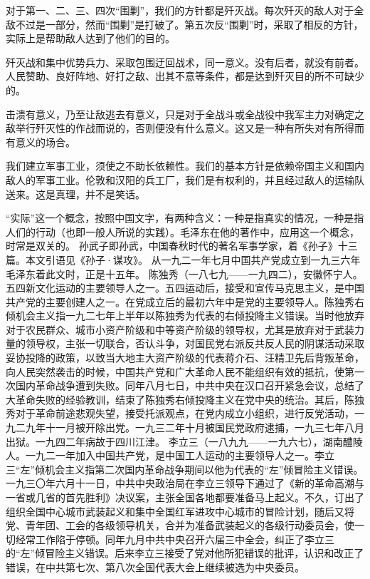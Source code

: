 对于第一、二、三、四次“围剿”，我们的方针都是歼灭战。每次歼灭的敌人对于全敌不过是一部分，然而“围剿”是打破了。第五次反“围剿”时，采取了相反的方针，实际上是帮助敌人达到了他们的目的。

歼灭战和集中优势兵力、采取包围迂回战术，同一意义。没有后者，就没有前者。人民赞助、良好阵地、好打之敌、出其不意等条件，都是达到歼灭目的所不可缺少的。

击溃有意义，乃至让敌逃去有意义，只是对于全战斗或全战役中我军主力对确定之敌举行歼灭性的作战而说的，否则便没有什么意义。这又是一种有所失对有所得而有意义的场合。

我们建立军事工业，须使之不助长依赖性。我们的基本方针是依赖帝国主义和国内敌人的军事工业。伦敦和汉阳的兵工厂，我们是有权利的，并且经过敌人的运输队送来。这是真理，并不是笑话。


\begin{maonote}
“实际”这一个概念，按照中国文字，有两种含义：一种是指真实的情况，一种是指人们的行动（也即一般人所说的实践）。毛泽东在他的著作中，应用这一个概念，时常是双关的。
孙武子即孙武，中国春秋时代的著名军事学家，着《孙子》十三篇。本文引语见《孙子·谋攻》。
从一九二一年七月中国共产党成立到一九三六年毛泽东着此文时，正是十五年。
陈独秀（一八七九——一九四二），安徽怀宁人。五四新文化运动的主要领导人之一。五四运动后，接受和宣传马克思主义，是中国共产党的主要创建人之一。在党成立后的最初六年中是党的主要领导人。陈独秀右倾机会主义指一九二七年上半年以陈独秀为代表的右倾投降主义错误。当时他放弃对于农民群众、城市小资产阶级和中等资产阶级的领导权，尤其是放弃对于武装力量的领导权，主张一切联合，否认斗争，对国民党右派反共反人民的阴谋活动采取妥协投降的政策，以致当大地主大资产阶级的代表蒋介石、汪精卫先后背叛革命，向人民突然袭击的时候，中国共产党和广大革命人民不能组织有效的抵抗，使第一次国内革命战争遭到失败。同年八月七日，中共中央在汉口召开紧急会议，总结了大革命失败的经验教训，结束了陈独秀右倾投降主义在党中央的统治。其后，陈独秀对于革命前途悲观失望，接受托派观点，在党内成立小组织，进行反党活动，一九二九年十一月被开除出党。一九三二年十月被国民党政府逮捕，一九三七年八月出狱。一九四二年病故于四川江津。
李立三（一八九九——一九六七），湖南醴陵人。一九二一年加入中国共产党，是中国工人运动的主要领导人之一。李立三“左”倾机会主义指第二次国内革命战争期间以他为代表的“左”倾冒险主义错误。一九三〇年六月十一日，中共中央政治局在李立三领导下通过了《新的革命高潮与一省或几省的首先胜利》决议案，主张全国各地都要准备马上起义。不久，订出了组织全国中心城市武装起义和集中全国红军进攻中心城市的冒险计划，随后又将党、青年团、工会的各级领导机关，合并为准备武装起义的各级行动委员会，使一切经常工作陷于停顿。同年九月中共中央召开六届三中全会，纠正了李立三的“左”倾冒险主义错误。后来李立三接受了党对他所犯错误的批评，认识和改正了错误，在中共第七次、第八次全国代表大会上继续被选为中央委员。

\end{maonote}
